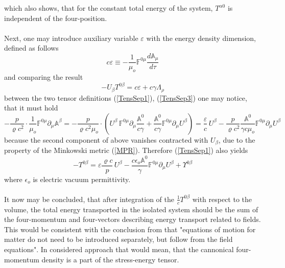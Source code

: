 \documentclass[aps,prx,preprint,groupedaddress,showkeys]{revtex4-2}
\newcommand{\mds}[1] {\frac{d {#1}}{d\tau}}
\begin{document}
which also shows, that for the constant total energy of the system, $T^{\alpha 0}$ is independent of the four-position.\\
~\\
Next, one may introduce auxiliary variable $\varepsilon$ with the energy density dimension, defined as follows
\begin{equation} \label{EpsDef}
c\varepsilon \equiv - \frac{1}{\mu_o} \mathbb{F}^{0 \mu} \mds {\mathbb{A}_{\mu}}
\end{equation}
and comparing the result
\begin{equation} \label{Lagr}
- U_{\beta}T^{0 \beta} = c\varepsilon + c\gamma \Lambda_{\rho}
\end{equation}
between the two tensor definitions (\ref{TensSep1}), (\ref{TensSep3}) one may notice, that it must hold
\begin{equation} \label{EpsProp}
- \frac{p}{\varrho c^2} \cdot \frac{1}{\mu_o} \mathbb{F}^{0 \mu} \partial_{\mu} \mathbb{A}^{\beta} = - \frac{p}{\varrho c^2 \mu_o} \cdot \left ( U^{\beta} \, \mathbb{F}^{0 \mu} \partial_{\mu} \frac{\mathbb{A}^0}{c\gamma} + \frac{\mathbb{A}^0}{c\gamma} \mathbb{F}^{0 \mu} \partial_{\mu} U^{\beta} \right )  = \frac{\varepsilon}{c} \, U^{\beta} - \frac{p}{\varrho c^2} \frac{\mathbb{A}^0}{\gamma c\mu_o} \mathbb{F}^{0 \mu} \partial_{\mu} U^{\beta}
\end{equation}
because the second component of above vanishes contracted with $U_{\beta}$, due to the property of the Minkowski metric (\ref{MPR}). Therefore (\ref{TensSep1}) also yields
\begin{equation} \label{TensSepTrans}
- T^{0 \beta} =  \varepsilon \frac{\varrho c}{p} \, U^{\beta} - \frac{c \epsilon_o \mathbb{A}^0}{\gamma} \mathbb{F}^{0 \mu} \partial_{\mu} U^{\beta} + \Upsilon^{0 \beta}
\end{equation}
where $\epsilon_o$ is electric vacuum permittivity.\\
~\\
It now may be concluded, that after integration of the $\frac{1}{c}T^{0 \beta}$ with respect to the volume, the total energy transported in the isolated system should be the sum of the four-momentum and four-vectors describing energy transport related to fields. This would be consistent with the conclusion from \cite{SETH} that "equations of motion for matter do not need to be introduced separately, but follow from the field equations". In considered approach that would mean, that the cannonical four-momentum density is a part of the stress-energy tensor.\\
\end{document}
